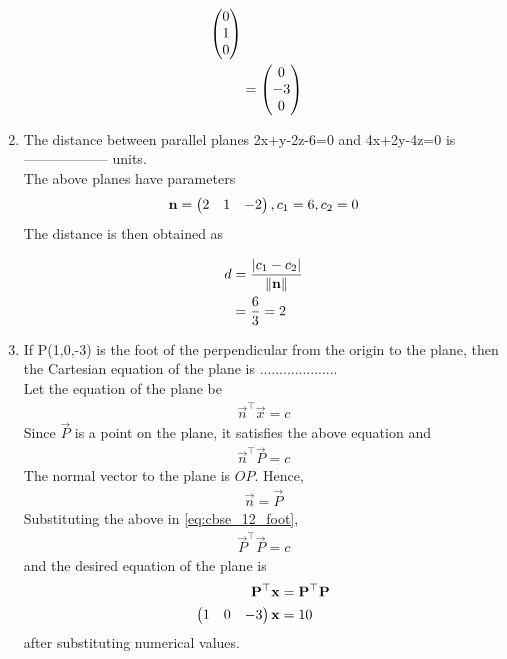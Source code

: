 \documentclass[journal,12pt,twocolumn]{IEEEtran}
\renewcommand\thesection{\arabic{section}}
\begin{document}
\begin{enumerate}[label=\thesection.\arabic*.,ref=\thesection.\theenumi]
\begin{align}
 \begin{pmatrix}0 \\ 1 \\ 0\end{pmatrix} 
 \\
	&=
 \begin{pmatrix}0 \\ -3 \\ 0\end{pmatrix} 
		\end{align}
\item  The distance between parallel planes 2x+y-2z-6=0 and 4x+2y-4z=0 is ------------------ units.
	\\
\solution The above planes have parameters
	\begin{align}
		\mathbf{n} = \begin{pmatrix}2 & 1 & -2\end{pmatrix}, c_1=6, c_2 = 0
\end{align}
The distance is then obtained as

\begin{align}
	d &= \frac{\left\vert c_1-c_2\right\vert}{\left\lVert\mathbf{n}\right\rVert} 
\\
	&= \frac{6}{3} = 2
\end{align}

\item If P(1,0,-3) is the foot of the perpendicular from the origin to the plane, then the Cartesian equation of the plane is .................... \\
    \solution Let the equation of the plane be 
	\begin{align}
		\vec{n}^{\top}\vec{x} = c
\end{align}
Since $\vec{P}$ is a point on the plane, it satisfies the above equation and 
	\begin{align}
		\vec{n}^{\top}\vec{P} = c
		\label{eq:cbse_12_foot}
\end{align}
The normal vector to the plane is $OP$.  Hence, 
	\begin{align}
		\vec{n} = \vec{P} 
\end{align}
		Substituting the above in \eqref{eq:cbse_12_foot},
	\begin{align}
		\vec{P}^{\top}\vec{P} = c
		\label{eq:cbse_12_foot_sub}
\end{align}
and the desired equation of the plane is 
	\begin{align}
		\mathbf{P}^{\top}\mathbf{x} &= 		\mathbf{P}^{\top}\mathbf{P}
		\\
		\begin{pmatrix}1 & 0 &-3\end{pmatrix}\mathbf{x} &= 	10	
		\label{eq:cbse_12_foot_ans}
\end{align}
   after substituting numerical values. 
    

\end{enumerate}
\end{document}
